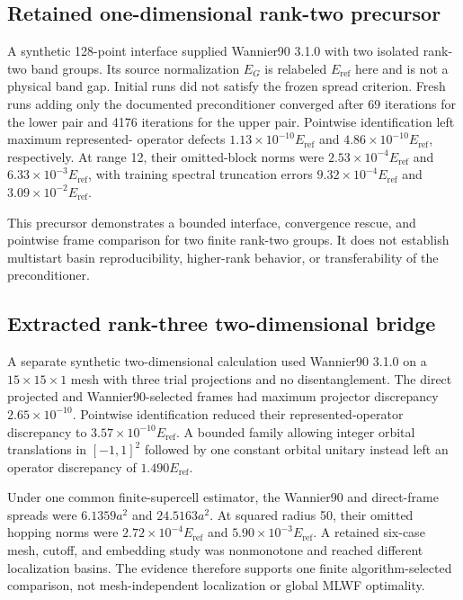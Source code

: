 \documentclass[11pt]{article}
\begin{document}
\subsection{Retained one-dimensional rank-two precursor}
A synthetic 128-point interface supplied Wannier90 3.1.0 with two isolated rank-two band
groups. Its source normalization $E_G$ is relabeled $E_{\mathrm{ref}}$ here and is not a
physical band gap. Initial runs did not satisfy the frozen spread criterion. Fresh runs adding only
the documented preconditioner converged after 69 iterations for the lower pair and 4176
iterations for the upper pair. Pointwise identification left maximum represented-
operator defects $1.13\times10^{-10}E_{\mathrm{ref}}$ and
$4.86\times10^{-10}E_{\mathrm{ref}}$, respectively. At range 12, their omitted-block
norms were $2.53\times10^{-4}E_{\mathrm{ref}}$ and
$6.33\times10^{-3}E_{\mathrm{ref}}$, with training spectral truncation errors
$9.32\times10^{-4}E_{\mathrm{ref}}$ and $3.09\times10^{-2}E_{\mathrm{ref}}$.

This precursor demonstrates a bounded interface, convergence rescue, and pointwise
frame comparison for two finite rank-two groups. It does not establish multistart basin
reproducibility, higher-rank behavior, or transferability of the preconditioner.

\subsection{Extracted rank-three two-dimensional bridge}
A separate synthetic two-dimensional calculation used Wannier90 3.1.0 on a $15\times15\times1$ mesh with three trial projections and no disentanglement. The direct projected and Wannier90-selected frames had maximum projector discrepancy $2.65\times10^{-10}$. Pointwise identification reduced their represented-operator discrepancy to $3.57\times10^{-10}E_{\mathrm{ref}}$. A bounded family allowing integer orbital translations in $[-1,1]^2$ followed by one constant orbital unitary instead left an operator discrepancy of $1.490E_{\mathrm{ref}}$.

Under one common finite-supercell estimator, the Wannier90 and direct-frame spreads were $6.1359a^2$ and $24.5163a^2$. At squared radius 50, their omitted hopping norms were $2.72\times10^{-4}E_{\mathrm{ref}}$ and $5.90\times10^{-3}E_{\mathrm{ref}}$. A retained six-case mesh, cutoff, and embedding study was nonmonotone and reached different localization basins. The evidence therefore supports one finite algorithm-selected comparison, not mesh-independent localization or global MLWF optimality.
\end{document}
